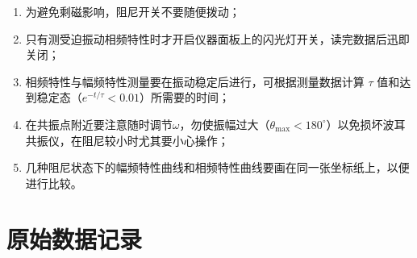 \documentclass[12pt,a4paper]{amsart}
\begin{document}
\begin{enumerate}
    \item 为避免剩磁影响，阻尼开关不要随便拨动；
    \item 只有测受迫振动相频特性时才开启仪器面板上的闪光灯开关，读完数据后迅即关闭；
    \item 相频特性与幅频特性测量要在振动稳定后进行，可根据测量数据计算 $\tau$ 值和达到稳定态（$e^{-t/\tau}<0.01$）所需要的时间；
    \item 在共振点附近要注意随时调节$\omega$，勿使振幅过大（$\theta_{\text{max}}<180^\circ$）以免损坏波耳共振仪，在阻尼较小时尤其要小心操作；
    \item 几种阻尼状态下的幅频特性曲线和相频特性曲线要画在同一张坐标纸上，以便进行比较。
\end{enumerate}

\section{原始数据记录}


{\footnotesize}
\end{document}
